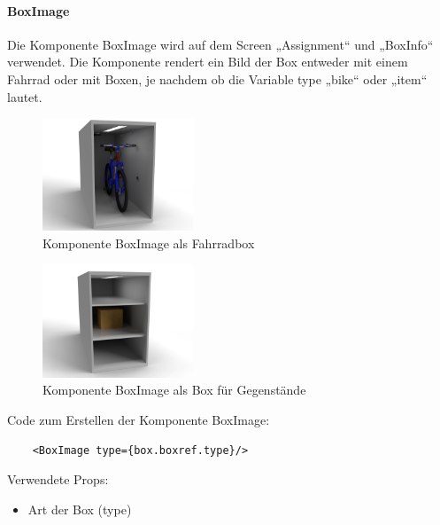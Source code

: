 \paragraph{BoxImage}Die Komponente BoxImage wird auf dem Screen „Assignment“ und „BoxInfo“ verwendet. Die Komponente rendert ein Bild der Box entweder mit einem Fahrrad oder mit Boxen, je nachdem ob die Variable type „bike“ oder „item“ lautet.\\
\begin{figure}[H]
  \centering
  \includegraphics[width=0.4\textwidth]{images/box_bike.png}
  \caption{Komponente BoxImage als Fahrradbox}
  \label{fig:boximagebike}
\end{figure}
\begin{figure}[H]
  \centering
  \includegraphics[width=0.4\textwidth]{images/box_item.png}
  \caption{Komponente BoxImage als Box für Gegenstände}
  \label{fig:boximageitem}
\end{figure}
Code zum Erstellen der Komponente BoxImage:\\
\begin{verbatim}
    <BoxImage type={box.boxref.type}/>
\end{verbatim}
Verwendete Props:
\begin{itemize}
  \item Art der Box (type)
\end{itemize}
